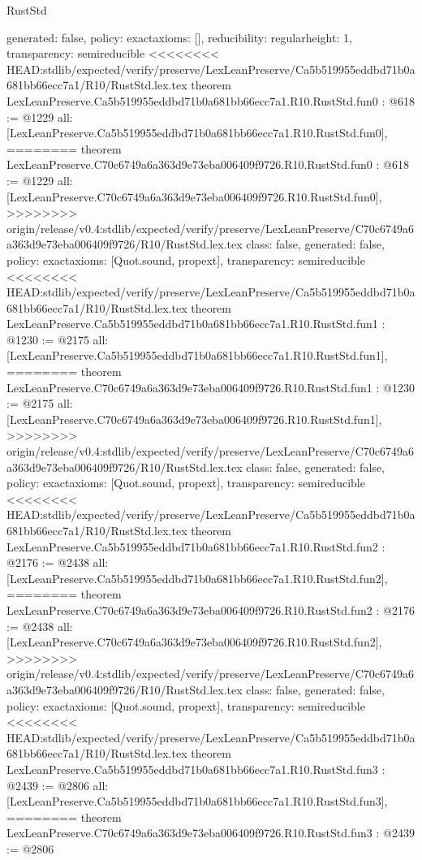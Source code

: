 \begin{lexlean}{RustStd}
\begin{coremodule}
{\begin{coremodule}
{{{  generated: false,
  policy: exact{axioms: []},
  reducibility: regular{height: 1},
  transparency: semireducible
}
<<<<<<<< HEAD:stdlib/expected/verify/preserve/LexLeanPreserve/Ca5b519955eddbd71b0a681bb66ecc7a1/R10/RustStd.lex.tex
theorem LexLeanPreserve.Ca5b519955eddbd71b0a681bb66ecc7a1.R10.RustStd.fun0 : @618 := @1229 {
  all: [LexLeanPreserve.Ca5b519955eddbd71b0a681bb66ecc7a1.R10.RustStd.fun0],
========
theorem LexLeanPreserve.C70c6749a6a363d9e73eba006409f9726.R10.RustStd.fun0 : @618 := @1229 {
  all: [LexLeanPreserve.C70c6749a6a363d9e73eba006409f9726.R10.RustStd.fun0],
>>>>>>>> origin/release/v0.4:stdlib/expected/verify/preserve/LexLeanPreserve/C70c6749a6a363d9e73eba006409f9726/R10/RustStd.lex.tex
  class: false,
  generated: false,
  policy: exact{axioms: [Quot.sound, propext]},
  transparency: semireducible
}
<<<<<<<< HEAD:stdlib/expected/verify/preserve/LexLeanPreserve/Ca5b519955eddbd71b0a681bb66ecc7a1/R10/RustStd.lex.tex
theorem LexLeanPreserve.Ca5b519955eddbd71b0a681bb66ecc7a1.R10.RustStd.fun1 : @1230 := @2175 {
  all: [LexLeanPreserve.Ca5b519955eddbd71b0a681bb66ecc7a1.R10.RustStd.fun1],
========
theorem LexLeanPreserve.C70c6749a6a363d9e73eba006409f9726.R10.RustStd.fun1 : @1230 := @2175 {
  all: [LexLeanPreserve.C70c6749a6a363d9e73eba006409f9726.R10.RustStd.fun1],
>>>>>>>> origin/release/v0.4:stdlib/expected/verify/preserve/LexLeanPreserve/C70c6749a6a363d9e73eba006409f9726/R10/RustStd.lex.tex
  class: false,
  generated: false,
  policy: exact{axioms: [Quot.sound, propext]},
  transparency: semireducible
}
<<<<<<<< HEAD:stdlib/expected/verify/preserve/LexLeanPreserve/Ca5b519955eddbd71b0a681bb66ecc7a1/R10/RustStd.lex.tex
theorem LexLeanPreserve.Ca5b519955eddbd71b0a681bb66ecc7a1.R10.RustStd.fun2 : @2176 := @2438 {
  all: [LexLeanPreserve.Ca5b519955eddbd71b0a681bb66ecc7a1.R10.RustStd.fun2],
========
theorem LexLeanPreserve.C70c6749a6a363d9e73eba006409f9726.R10.RustStd.fun2 : @2176 := @2438 {
  all: [LexLeanPreserve.C70c6749a6a363d9e73eba006409f9726.R10.RustStd.fun2],
>>>>>>>> origin/release/v0.4:stdlib/expected/verify/preserve/LexLeanPreserve/C70c6749a6a363d9e73eba006409f9726/R10/RustStd.lex.tex
  class: false,
  generated: false,
  policy: exact{axioms: [Quot.sound, propext]},
  transparency: semireducible
}
<<<<<<<< HEAD:stdlib/expected/verify/preserve/LexLeanPreserve/Ca5b519955eddbd71b0a681bb66ecc7a1/R10/RustStd.lex.tex
theorem LexLeanPreserve.Ca5b519955eddbd71b0a681bb66ecc7a1.R10.RustStd.fun3 : @2439 := @2806 {
  all: [LexLeanPreserve.Ca5b519955eddbd71b0a681bb66ecc7a1.R10.RustStd.fun3],
========
theorem LexLeanPreserve.C70c6749a6a363d9e73eba006409f9726.R10.RustStd.fun3 : @2439 := @2806 {
}}}}}}}
\end{coremodule}}
\end{coremodule}
\end{lexlean}
